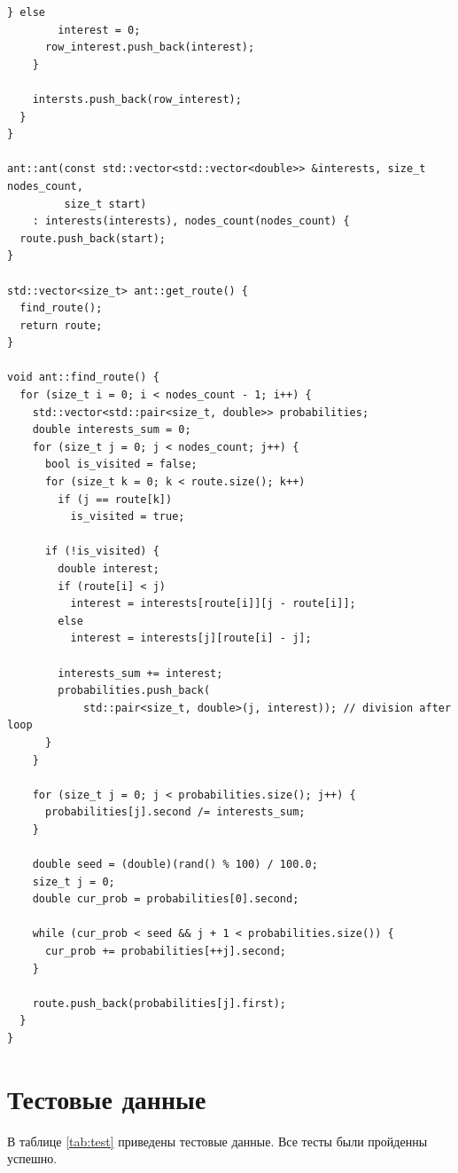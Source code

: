 \documentclass[12pt]{report}
\begin{document}
\begin{lstlisting}[label=some-code,caption=Муравьиный алгоритм, language=с]
      } else
        interest = 0;
      row_interest.push_back(interest);
    }

    intersts.push_back(row_interest);
  }
}

ant::ant(const std::vector<std::vector<double>> &interests, size_t nodes_count,
         size_t start)
    : interests(interests), nodes_count(nodes_count) {
  route.push_back(start);
}

std::vector<size_t> ant::get_route() {
  find_route();
  return route;
}

void ant::find_route() {
  for (size_t i = 0; i < nodes_count - 1; i++) {
    std::vector<std::pair<size_t, double>> probabilities;
    double interests_sum = 0;
    for (size_t j = 0; j < nodes_count; j++) {
      bool is_visited = false;
      for (size_t k = 0; k < route.size(); k++)
        if (j == route[k])
          is_visited = true;

      if (!is_visited) {
        double interest;
        if (route[i] < j)
          interest = interests[route[i]][j - route[i]];
        else
          interest = interests[j][route[i] - j];

        interests_sum += interest;
        probabilities.push_back(
            std::pair<size_t, double>(j, interest)); // division after loop
      }
    }

    for (size_t j = 0; j < probabilities.size(); j++) {
      probabilities[j].second /= interests_sum;
    }

    double seed = (double)(rand() % 100) / 100.0;
    size_t j = 0;
    double cur_prob = probabilities[0].second;

    while (cur_prob < seed && j + 1 < probabilities.size()) {
      cur_prob += probabilities[++j].second;
    }

    route.push_back(probabilities[j].first);
  }
}

\end{lstlisting}

\section{Тестовые данные}

В таблице \ref{tab:test} приведены тестовые данные. Все тесты были пройденны успешно.
\end{document}
